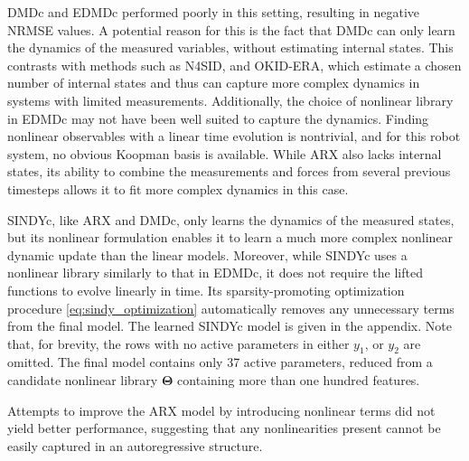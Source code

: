 \documentclass[../main.tex]{subfiles}
\begin{document}
DMDc and EDMDc performed poorly in this setting, resulting in negative NRMSE values. A potential reason for this is the fact that DMDc can only learn the dynamics of the measured variables, without estimating internal states. This contrasts with methods such as N4SID, and OKID-ERA, which estimate a chosen number of internal states and thus can capture more complex dynamics in systems with limited measurements. Additionally, the choice of nonlinear library in EDMDc may not have been well suited to capture the dynamics. Finding nonlinear observables with a linear time evolution is nontrivial, and for this robot system, no obvious Koopman basis is available. While ARX also lacks internal states, its ability to combine the measurements and forces from several previous timesteps allows it to fit more complex dynamics in this case.


SINDYc, like ARX and DMDc, only learns the dynamics of the measured states, but its nonlinear formulation enables it to learn a much more complex nonlinear dynamic update than the linear models. Moreover, while SINDYc uses a nonlinear library similarly to that in  EDMDc, it does not require the lifted functions to evolve linearly in time. Its sparsity-promoting optimization procedure \cref{eq:sindy_optimization} automatically removes any unnecessary terms from the final model.
The learned SINDYc model is given in the appendix. Note that, for brevity, the rows with no active parameters in either $y_1$, or $y_2$ are omitted. The final model contains only 37 active parameters, reduced from a candidate nonlinear library $\bm{\Theta}$ containing more than one hundred features.

Attempts to improve the ARX model by introducing nonlinear terms did not yield better performance, suggesting that any nonlinearities present cannot be easily captured in an autoregressive structure.


\end{document}
